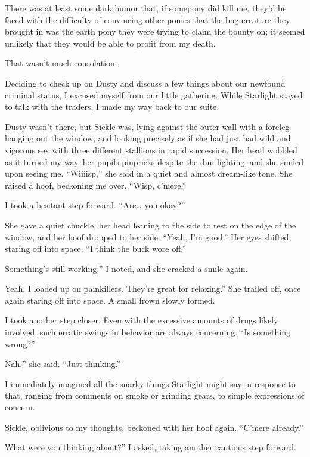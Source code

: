 There was at least some dark humor that, if somepony did kill me, they’d be faced with the difficulty of convincing other ponies that the bug-creature they brought in was the earth pony they were trying to claim the bounty on; it seemed unlikely that they would be able to profit from my death.

That wasn’t much consolation.

Deciding to check up on Dusty and discuss a few things about our newfound criminal status, I excused myself from our little gathering. While Starlight stayed to talk with the traders, I made my way back to our suite.

Dusty wasn’t there, but Sickle was, lying against the outer wall with a foreleg hanging out the window, and looking precisely as if she had just had wild and vigorous sex with three different stallions in rapid succession. Her head wobbled as it turned my way, her pupils pinpricks despite the dim lighting, and she smiled upon seeing me. “Wiiiisp,” she said in a quiet and almost dream-like tone. She raised a hoof, beckoning me over. “Wisp, c’mere.”

I took a hesitant step forward. “Are… you okay?”

She gave a quiet chuckle, her head leaning to the side to rest on the edge of the window, and her hoof dropped to her side. “Yeah, I’m good.” Her eyes shifted, staring off into space. “I think the buck wore off.”

\leavevmode{}Something’s still working,” I noted, and she cracked a smile again.

\leavevmode{}Yeah, I loaded up on painkillers. They’re great for relaxing.” She trailed off, once again staring off into space. A small frown slowly formed.

I took another step closer. Even with the excessive amounts of drugs likely involved, such erratic swings in behavior are always concerning. “Is something wrong?”

\leavevmode{}Nah,” she said. “Just thinking.”

I immediately imagined all the snarky things Starlight might say in response to that, ranging from comments on smoke or grinding gears, to simple expressions of concern.

Sickle, oblivious to my thoughts, beckoned with her hoof again. “C’mere already.”

\leavevmode{}What were you thinking about?” I asked, taking another cautious step forward.

